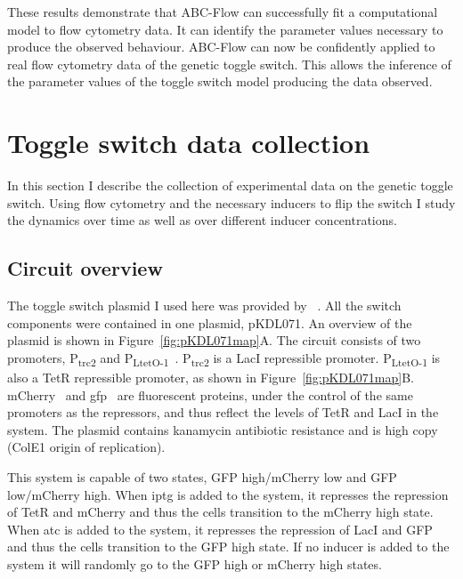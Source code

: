 \clearpage
These results demonstrate that ABC-Flow can successfully fit a computational model to flow cytometry data. It can identify the parameter values necessary to produce the observed behaviour. ABC-Flow can now be confidently applied to real flow cytometry data of the genetic toggle switch. This allows the inference of the parameter values of the toggle switch model producing the data observed. %


\section{Toggle switch data collection}

In this section I describe the collection of experimental data on the genetic toggle switch. Using flow cytometry and the necessary inducers to flip the switch I study the dynamics over time as well as over different inducer concentrations. 

\subsection{Circuit overview}

The toggle switch plasmid I used here was provided by ~\textcite{Litcofsky:2012gr}. All the switch components were contained in one plasmid, pKDL071. An overview of the plasmid is shown in Figure~\ref{fig:pKDL071map}A. The circuit consists of two promoters, P\textsubscript{trc2} and P\textsubscript{LtetO-1}~\autocite{Lutz:1997ti}. P\textsubscript{trc2} is a LacI repressible promoter. P\textsubscript{LtetO-1} is also a TetR repressible promoter, as shown in Figure~\ref{fig:pKDL071map}B. mCherry~\autocite{Shaner:2004vy} and \acrshort{gfp}~\autocite{SHIMOMURA:1962va} are fluorescent proteins, under the control of the same promoters as the repressors, and thus reflect the levels of TetR and LacI in the system. The plasmid contains kanamycin antibiotic resistance and is high copy (ColE1 origin of replication).

This system is capable of two states, GFP high/mCherry low and GFP low/mCherry high. When \acrshort{iptg} is added to the system, it represses the repression of TetR and mCherry and thus the cells transition to the mCherry high state. When \acrshort{atc} is added to the system, it represses the repression of LacI and GFP and thus the cells transition to the GFP high state. If no inducer is added to the system it will randomly go to the GFP high or mCherry high states.

